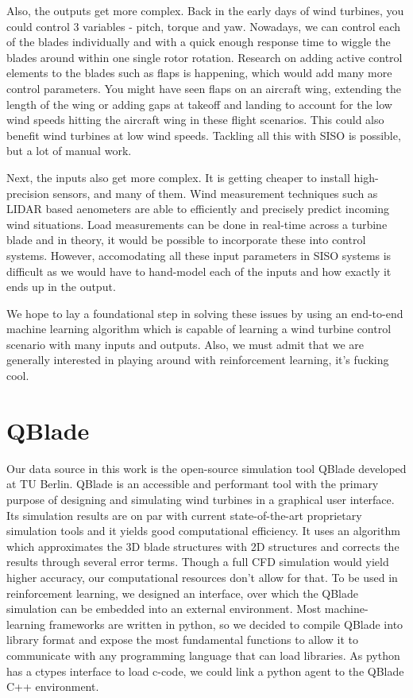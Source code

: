 \documentclass[hyperref,german,beleg]{cgvpub}
\begin{document}
Also, the outputs get more complex. Back in the early days of wind turbines, you could control 3 variables - pitch, torque and yaw. Nowadays, we can control each of the blades individually and with a quick enough response time to wiggle the blades around within one single rotor rotation. Research on adding active control elements to the blades such as flaps is happening, which would add many more control parameters. You might have seen flaps on an aircraft wing, extending the length of the wing or adding gaps at takeoff and landing to account for the low wind speeds hitting the aircraft wing in these flight scenarios. This could also benefit wind turbines at low wind speeds. Tackling all this with \ac{SISO} is possible, but a lot of manual work.

Next, the inputs also get more complex. It is getting cheaper to install high-precision sensors, and many of them. Wind measurement techniques such as LIDAR based aenometers are able to efficiently and precisely predict incoming wind situations. Load measurements can be done in real-time across a turbine blade and in theory, it would be possible to incorporate these into control systems. However, accomodating all these input parameters in \ac{SISO} systems is difficult as we would have to hand-model each of the inputs and how exactly it ends up in the output.

We hope to lay a foundational step in solving these issues by using an end-to-end machine learning algorithm which is capable of learning a wind turbine control scenario with many inputs and outputs. Also, we must admit that we are generally interested in playing around with reinforcement learning, it's fucking cool.

\section{QBlade}
Our data source in this work is the open-source simulation tool QBlade \cite{martenQBLADEOPENSOURCE2013} developed at TU Berlin. QBlade is an accessible and performant tool with the primary purpose of designing and simulating wind turbines in a graphical user interface. Its simulation results are on par with current state-of-the-art proprietary simulation tools and it yields good computational efficiency. It uses an algorithm which approximates the 3D blade structures with 2D structures and corrects the results through several error terms. Though a full CFD simulation would yield higher accuracy, our computational resources don't allow for that. To be used in reinforcement learning, we designed an interface, over which the QBlade simulation can be embedded into an external environment. Most machine-learning frameworks are written in python, so we decided to compile QBlade into library format and expose the most fundamental functions to allow it to communicate with any programming language that can load libraries. As python has a ctypes interface to load c-code, we could link a python agent to the QBlade C++ environment.
\end{document}
